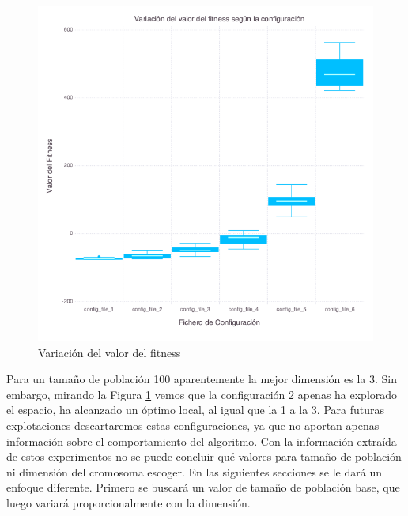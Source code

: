 \begin{figure}[]
	\centering	
	\includegraphics[scale=0.4]{figuras/config_file_1-6_Rastrigin_box_plots.png}
	\caption{ Variación del valor del fitness }
    \label{fig:box_plots}
\end{figure}

Para un tamaño de población 100 aparentemente la mejor dimensión es la 3. Sin embargo, mirando la Figura \ref{fig:box_plots} vemos
que la configuración 2 apenas ha explorado el espacio, ha alcanzado un óptimo local, al igual que la 1 a la 3. Para
futuras explotaciones descartaremos estas configuraciones, ya que no aportan apenas información sobre el comportamiento del algoritmo.
Con la información extraída de estos experimentos no se puede concluir qué valores para tamaño de población ni dimensión del cromosoma 
escoger. En las siguientes secciones se le dará un enfoque diferente. Primero se buscará un valor de
tamaño de población base, que luego variará proporcionalmente con la dimensión.